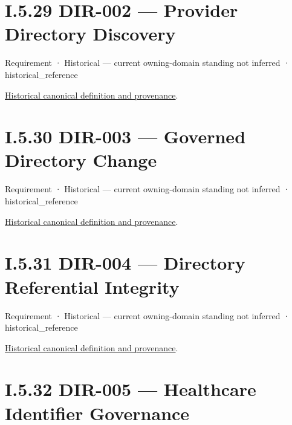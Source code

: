 \section*{I.5.29 DIR-002 — Provider Directory Discovery}
\label{navigation:I.5.29}

\label{element:27998c2a8f2e497a814b32e7a0bc5e03}
{\small Requirement · Historical — current owning-domain standing not inferred · historical\_reference}\par
\href{../../../../continuum/motivation/requirement/27998c2a8f2e497a814b32e7a0bc5e03.md}{Historical canonical definition and provenance}.\par
\section*{I.5.30 DIR-003 — Governed Directory Change}
\label{navigation:I.5.30}

\label{element:934462c11133409cb3aa59bf2502fa81}
{\small Requirement · Historical — current owning-domain standing not inferred · historical\_reference}\par
\href{../../../../continuum/motivation/requirement/934462c11133409cb3aa59bf2502fa81.md}{Historical canonical definition and provenance}.\par
\section*{I.5.31 DIR-004 — Directory Referential Integrity}
\label{navigation:I.5.31}

\label{element:f866ae5adb08499794331bc600db827c}
{\small Requirement · Historical — current owning-domain standing not inferred · historical\_reference}\par
\href{../../../../continuum/motivation/requirement/f866ae5adb08499794331bc600db827c.md}{Historical canonical definition and provenance}.\par
\section*{I.5.32 DIR-005 — Healthcare Identifier Governance}
\label{navigation:I.5.32}

